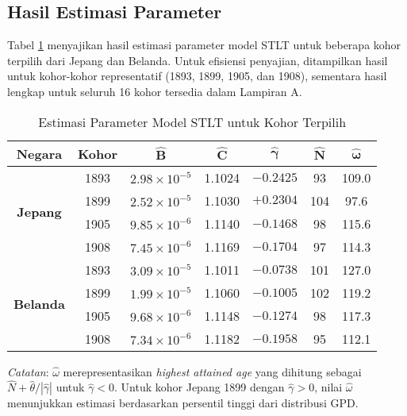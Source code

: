 \subsection{Hasil Estimasi Parameter}

Tabel \ref{tab:stlt_params_selected_cohorts} menyajikan hasil estimasi parameter model STLT untuk beberapa kohor terpilih dari Jepang dan Belanda. Untuk efisiensi penyajian, ditampilkan hasil untuk kohor-kohor representatif (1893, 1899, 1905, dan 1908), sementara hasil lengkap untuk seluruh 16 kohor tersedia dalam Lampiran A.

\begin{table}[H]
\centering
\caption{Estimasi Parameter Model STLT untuk Kohor Terpilih}
\label{tab:stlt_params_selected_cohorts}
\small
\begin{tabular}{ccccccc}
\hline
\textbf{Negara} & \textbf{Kohor} & $\boldsymbol{\hat{B}}$ & $\boldsymbol{\hat{C}}$ & $\boldsymbol{\hat{\gamma}}$ & $\boldsymbol{\hat{N}}$ & $\boldsymbol{\hat{\omega}}$ \\
\hline
\multirow{4}{*}{\textbf{Jepang}} 
& 1893 & $2.98 \times 10^{-5}$ & 1.1024 & $-0.2425$ & 93 & 109.0 \\
& 1899 & $2.52 \times 10^{-5}$ & 1.1030 & $+0.2304$ & 104 & 97.6 \\
& 1905 & $9.85 \times 10^{-6}$ & 1.1140 & $-0.1468$ & 98 & 115.6 \\
& 1908 & $7.45 \times 10^{-6}$ & 1.1169 & $-0.1704$ & 97 & 114.3 \\
\hline
\multirow{4}{*}{\textbf{Belanda}} 
& 1893 & $3.09 \times 10^{-5}$ & 1.1011 & $-0.0738$ & 101 & 127.0 \\
& 1899 & $1.99 \times 10^{-5}$ & 1.1060 & $-0.1005$ & 102 & 119.2 \\
& 1905 & $9.68 \times 10^{-6}$ & 1.1148 & $-0.1274$ & 98 & 117.3 \\
& 1908 & $7.34 \times 10^{-6}$ & 1.1182 & $-0.1958$ & 95 & 112.1 \\
\hline
\end{tabular}
\begin{tablenotes}
\small
\item \textit{Catatan}: $\hat{\omega}$ merepresentasikan \textit{highest attained age} yang dihitung sebagai $\hat{N} + \hat{\theta}/|\hat{\gamma}|$ untuk $\hat{\gamma} < 0$. Untuk kohor Jepang 1899 dengan $\hat{\gamma} > 0$, nilai $\hat{\omega}$ menunjukkan estimasi berdasarkan persentil tinggi dari distribusi GPD.
\end{tablenotes}
\end{table}



